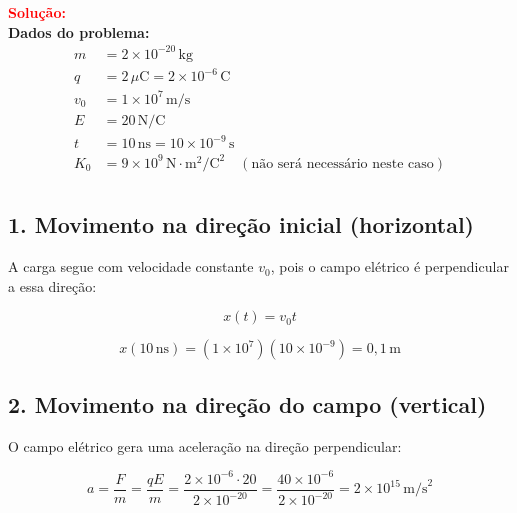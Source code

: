 \documentclass[a4paper,12pt]{article}
\begin{document}
\begin{flushleft}
\begin{center}

\end{center}

\textcolor{red}{\textbf{Solução:}}\\

\textbf{Dados do problema:}
\begin{align*}
m &= 2 \times 10^{-20} \, \text{kg} \\
q &= 2 \, \mu\text{C} = 2 \times 10^{-6} \, \text{C} \\
v_0 &= 1 \times 10^7 \, \text{m/s} \\
E &= 20 \, \text{N/C} \\
t &= 10 \, \text{ns} = 10 \times 10^{-9} \, \text{s} \\
K_0 &= 9 \times 10^9 \, \text{N} \cdot \text{m}^2/\text{C}^2 \quad (\text{não será necessário neste caso}) \\
\end{align*}

\subsection*{1. Movimento na direção inicial (horizontal)}

A carga segue com velocidade constante \( v_0 \), pois o campo elétrico é perpendicular a essa direção:

\[
x(t) = v_0 t
\]

\[
x(10\, \text{ns}) = (1 \times 10^7)(10 \times 10^{-9}) = 0{,}1 \, \text{m}
\]

\subsection*{2. Movimento na direção do campo (vertical)}

O campo elétrico gera uma aceleração na direção perpendicular:

\[
a = \frac{F}{m} = \frac{qE}{m} = \frac{2 \times 10^{-6} \cdot 20}{2 \times 10^{-20}} = \frac{40 \times 10^{-6}}{2 \times 10^{-20}} = 2 \times 10^{15} \, \text{m/s}^2
\]


\end{flushleft}
\end{document}
